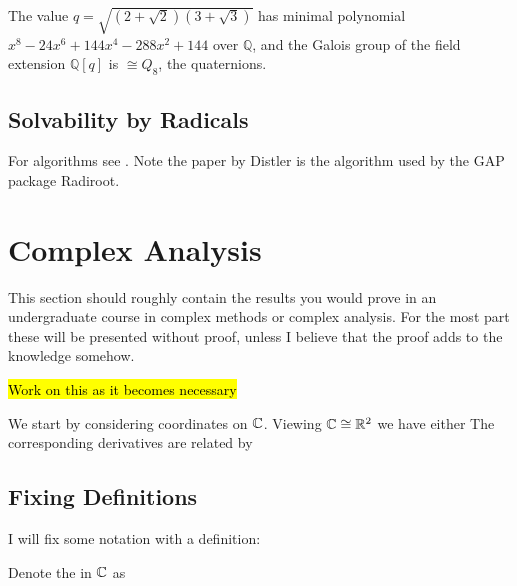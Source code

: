\documentclass{article}
\begin{document}
\begin{example}
	The value $q = \sqrt{(2+\sqrt{2})(3+\sqrt{3})}$ has minimal polynomial $x^8 - 24x^6 + 144x^4 - 288x^2 + 144$ over $\mathbb{Q}$, and the Galois group of the field extension $\mathbb{Q}[q]$ is $\cong Q_8$, the quaternions. 
\end{example}

\subsection{Solvability by Radicals}
For algorithms see \cite{Landau1985, Distler2005}. Note the paper by Distler is the algorithm used by the GAP package Radiroot. 

\section{Complex Analysis}
This section should roughly contain the results you would prove in an undergraduate course in complex methods or complex analysis. For the most part these will be presented without proof, unless I believe that the proof adds to the knowledge somehow. 

\hl{Work on this as it becomes necessary}

We start by considering coordinates on $\mathbb{C}$. Viewing $\mathbb{C}\cong \mathbb{R}^2$ we have either 
The corresponding derivatives are related by 
\subsection{Fixing Definitions}
I will fix some notation with a definition:
\begin{definition}\label{def: UHP}
	Denote the  in $\mathbb{C}$ as 
\end{definition}
\end{document}
